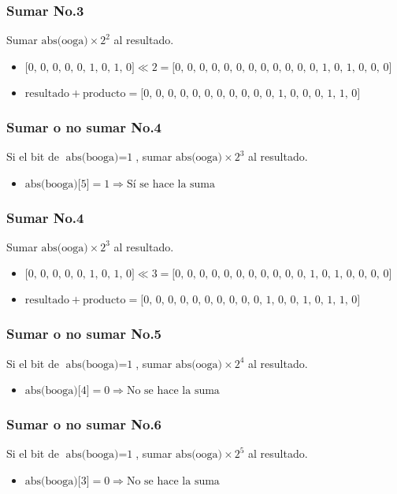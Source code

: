 \documentclass{beamer}
\begin{document}
\begin{frame}
\frametitle{Sumar No.3}
Sumar $\text{abs(ooga)}\times\text{2}^{\text{2}}$ al resultado.
\begin{itemize}
\item $\text{[0, 0, 0, 0, 0, 1, 0, 1, 0]}\ll\text{2}=\text{[0, 0, 0, 0, 0, 0, 0, 0, 0, 0, 0, 0, 1, 0, 1, 0, 0, 0]}$
\item $\text{resultado}+\text{producto}=\text{[0, 0, 0, 0, 0, 0, 0, 0, 0, 0, 0, 1, 0, 0, 0, 1, 1, 0]}$
\end{itemize}
\end{frame}
\begin{frame}
\frametitle{Sumar o no sumar No.4}
Si el bit de $\text{abs(booga)}=\text{1}$, sumar $\text{abs(ooga)}\times\text{2}^{\text{3}}$ al resultado.
\begin{itemize}
\item $\text{abs(booga)[5]}=\text{1}\Longrightarrow\text{Sí se hace la suma}$
\end{itemize}
\end{frame}
\begin{frame}
\frametitle{Sumar No.4}
Sumar $\text{abs(ooga)}\times\text{2}^{\text{3}}$ al resultado.
\begin{itemize}
\item $\text{[0, 0, 0, 0, 0, 1, 0, 1, 0]}\ll\text{3}=\text{[0, 0, 0, 0, 0, 0, 0, 0, 0, 0, 0, 1, 0, 1, 0, 0, 0, 0]}$
\item $\text{resultado}+\text{producto}=\text{[0, 0, 0, 0, 0, 0, 0, 0, 0, 0, 1, 0, 0, 1, 0, 1, 1, 0]}$
\end{itemize}
\end{frame}
\begin{frame}
\frametitle{Sumar o no sumar No.5}
Si el bit de $\text{abs(booga)}=\text{1}$, sumar $\text{abs(ooga)}\times\text{2}^{\text{4}}$ al resultado.
\begin{itemize}
\item $\text{abs(booga)[4]}=\text{0}\Longrightarrow\text{No se hace la suma}$
\end{itemize}
\end{frame}
\begin{frame}
\frametitle{Sumar o no sumar No.6}
Si el bit de $\text{abs(booga)}=\text{1}$, sumar $\text{abs(ooga)}\times\text{2}^{\text{5}}$ al resultado.
\begin{itemize}
\item $\text{abs(booga)[3]}=\text{0}\Longrightarrow\text{No se hace la suma}$
\end{itemize}
\end{frame}
\end{document}
